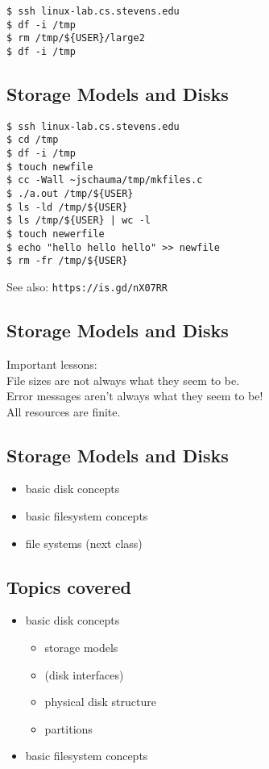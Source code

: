 \documentclass[xga]{xdvislides}
\begin{document}
\begin{verbatim}
$ ssh linux-lab.cs.stevens.edu
$ df -i /tmp
$ rm /tmp/${USER}/large2
$ df -i /tmp
\end{verbatim}

\subsection{Storage Models and Disks}

\begin{verbatim}
$ ssh linux-lab.cs.stevens.edu
$ cd /tmp
$ df -i /tmp
$ touch newfile
$ cc -Wall ~jschauma/tmp/mkfiles.c
$ ./a.out /tmp/${USER}
$ ls -ld /tmp/${USER}
$ ls /tmp/${USER} | wc -l
$ touch newerfile
$ echo "hello hello hello" >> newfile
$ rm -fr /tmp/${USER}
\end{verbatim}

See also:
\verb+https://is.gd/nX07RR+

\subsection{Storage Models and Disks}
Important lessons: \\

File sizes are not always what they seem to be. \\

Error messages aren't always what they seem to be! \\

All resources are finite.

\subsection{Storage Models and Disks}
\begin{itemize}
	\item basic disk concepts
	\item basic filesystem concepts
	\item file systems (next class)
\end{itemize}

\subsection{Topics covered}
\begin{itemize}
	\item basic disk concepts
		\begin{itemize}
			\item storage models
			\item (disk interfaces)
			\item physical disk structure
			\item partitions
		\end{itemize}
	\item basic filesystem concepts
\end{itemize}
\end{document}
